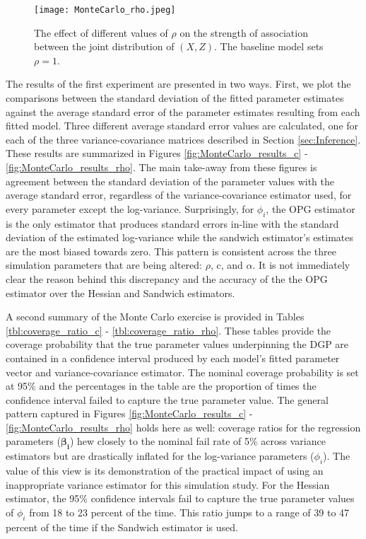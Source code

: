 \documentclass[12pt]{article}
\theoremstyle{definition}
\begin{document}
\begin{figure}[!ht]
    \centering
    \texttt{[image: MonteCarlo\_rho.jpeg]}
    \caption{The effect of different values of $\rho$ on the strength of association between the joint distribution of $(X, Z)$. The baseline model sets $\rho = 1$.} 
    \label{fig:MC_rho}
\end{figure}

The results of the first experiment are presented in two ways. First, we plot the comparisons between the standard deviation of the fitted parameter estimates against the average standard error of the parameter estimates resulting from each fitted model. Three different average standard error values are calculated, one for each of the three variance-covariance matrices described in Section \ref{sec:Inference}. These results are summarized in Figures \ref{fig:MonteCarlo_results_c} - \ref{fig:MonteCarlo_results_rho}. The main take-away from these figures is agreement between the standard deviation of the parameter values with the average standard error, regardless of the variance-covariance estimator used, for every parameter except the log-variance. Surprisingly, for $\phi_{i}$, the OPG estimator is the only estimator that produces standard errors in-line with the standard deviation of the estimated log-variance while the sandwich estimator's estimates are the most biased towards zero. This pattern is consistent across the three simulation parameters that are being altered: $\rho$, c, and $\alpha$. It is not immediately clear the reason behind this discrepancy and the accuracy of the the OPG estimator over the Hessian and Sandwich estimators. 

\bigskip

A second summary of the Monte Carlo exercise is provided in Tables \ref{tbl:coverage_ratio_c} - \ref{tbl:coverage_ratio_rho}. These tables provide the coverage probability that the true parameter values underpinning the DGP are contained in a confidence interval produced by each model's fitted parameter vector and variance-covariance estimator. The nominal coverage probability is set at 95\% and the percentages in the table are the proportion of times the confidence interval failed to capture the true parameter value. The general pattern captured in Figures \ref{fig:MonteCarlo_results_c} - \ref{fig:MonteCarlo_results_rho} holds here as well: coverage ratios for the regression parameters ($\boldsymbol{\beta_{i}}$) hew closely to the nominal fail rate of 5\% across variance estimators but are drastically inflated for the log-variance parameters ($\phi_{i}$). The value of this view is its demonstration of the practical impact of using an inappropriate variance estimator for this simulation study. For the Hessian estimator, the 95\% confidence intervals fail to capture the true parameter values of $\phi_{i}$ from 18 to 23 percent of the time. This ratio jumps to a range of 39 to 47 percent of the time if the Sandwich estimator is used. 
\end{document}
